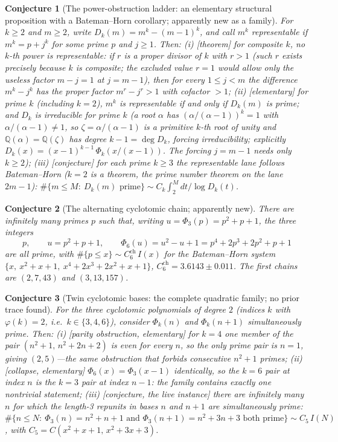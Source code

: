 \documentclass[11pt]{article}
\newtheorem{conjecture}{Conjecture}
\theoremstyle{definition}
\begin{document}
\setcounter{conjecture}{22}%
\begin{conjecture}[The power-obstruction ladder: an elementary
structural proposition with a Bateman--Horn corollary; apparently new
as a family]\label{c4}
For $k\ge2$ and $m\ge2$, write $D_k(m)=m^k-(m-1)^k$, and call $m^k$
representable if $m^k=p+j^k$ for some prime $p$ and $j\ge1$.  Then:
\emph{(i)} [theorem] for \emph{composite} $k$, no $k$-th power is
representable: if $r$ is a proper divisor of $k$ with $r>1$ (such
$r$ exists precisely because $k$ is composite; the excluded value
$r=1$ would allow only the useless factor $m-j=1$ at $j=m-1$), then
for every
$1\le j<m$ the difference $m^k-j^k$ has the proper factor $m^r-j^r>1$
with cofactor $>1$;
\emph{(ii)} [elementary] for \emph{prime} $k$ (including $k=2$),
$m^k$ is representable if and only if $D_k(m)$ is prime; and $D_k$ is
irreducible for prime $k$ (a root $\alpha$ has $(\alpha/(\alpha-1))^k=1$ with
$\alpha/(\alpha-1)\neq1$, so $\zeta=\alpha/(\alpha-1)$ is a primitive
$k$-th root of unity and $\mathbb Q(\alpha)=\mathbb Q(\zeta)$ has degree
$k-1=\deg D_k$, forcing irreducibility; explicitly
$D_k(x)=(x-1)^{k-1}\,\Phi_k(x/(x-1))$.  The forcing $j=m-1$ needs only
$k\ge2$);
\emph{(iii)} [conjecture] for each prime $k\ge3$ the representable lane follows
Bateman--Horn ($k=2$ is a theorem, the prime number theorem on the
lane $2m-1$):
$\#\{m\le M:\ D_k(m) \text{ prime}\}\sim C_k\int_2^M dt/\log D_k(t)$.
\end{conjecture}

\setcounter{conjecture}{23}%
\begin{conjecture}[The alternating cyclotomic chain; apparently
new]\label{c6}
There are infinitely many primes $p$ such that, writing
$u=\Phi_3(p)=p^2+p+1$, the three integers
\[
p,\qquad u=p^2+p+1,\qquad
\Phi_6(u)=u^2-u+1=p^4+2p^3+2p^2+p+1
\]
are all prime, with
$\#\{p\le x\}\sim C_6^{\mathrm{ch}}\,I(x)$ for the Bateman--Horn
system $\{x,\ x^2+x+1,\ x^4+2x^3+2x^2+x+1\}$,
$C_6^{\mathrm{ch}}=3.6143\pm0.011$.  The first chains are
$(2,7,43)$ and $(3,13,157)$.
\end{conjecture}

\setcounter{conjecture}{24}%
\begin{conjecture}[Twin cyclotomic bases: the complete quadratic
family; no prior trace found]\label{c5}
For the three cyclotomic polynomials of degree $2$ (indices $k$ with
$\varphi(k)=2$, i.e.\ $k\in\{3,4,6\}$), consider
$\Phi_k(n)$ and $\Phi_k(n+1)$ simultaneously prime.  Then:
\emph{(i)} [parity obstruction, elementary] for $k=4$ one member of
the pair $(n^2+1,\,n^2+2n+2)$ is even for \emph{every} $n$, so the
only prime pair is $n=1$, giving $(2,5)$---the same obstruction that
forbids consecutive $n^2+1$ primes;
\emph{(ii)} [collapse, elementary] $\Phi_6(x)=\Phi_3(x-1)$
identically, so the $k=6$ pair at index $n$ \emph{is} the $k=3$ pair
at index $n-1$: the family contains exactly one nontrivial statement;
\emph{(iii)} [conjecture, the live instance] there are infinitely many
$n$ for which the length-3 repunits in bases $n$ and $n+1$ are
simultaneously prime:
$\#\{n\le N:\ \Phi_3(n)=n^2+n+1 \text{ and }
\Phi_3(n+1)=n^2+3n+3 \text{ both prime}\}\sim C_5\,I(N)$,
with $C_5=C(x^2+x+1,\,x^2+3x+3)$.
\end{conjecture}
\end{document}
